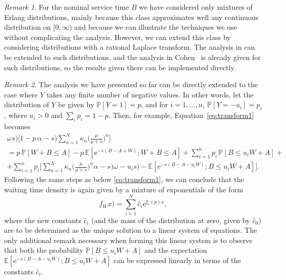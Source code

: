 \documentclass[reqno, 11pt, a4paper]{article}
\theoremstyle{plain}
\theoremstyle{remark}
\newtheorem{remark}{Remark}
\numberwithin{equation}{section}
\begin{document}
\begin{remark}
For the nominal service time $B$ we have considered only mixtures of Erlang distributions, mainly because this class approximates well any continuous distribution on $[0, \infty)$ and because we can illustrate the techniques we use without complicating the analysis. However, we can extend this class by considering distributions with a rational Laplace transform. The analysis in \cite{vlasiou05} can be extended to such distributions, and the analysis in Cohen~\cite[Section II.5.10]{cohen-SSQ} is already given for such distributions, so the results given there can be implemented directly.
\end{remark}

\begin{remark}
The analysis we have presented so far can be directly extended to the case where $Y$ takes any finite number of negative values. In other words, let the distribution of $Y$ be given by ${\mathbb{P}}[Y=1]=p$, and for $i=1,\ldots,n$, ${\mathbb{P}}[Y=-u_i]=p_i$, where $u_i>0$ and $\sum_i p_i=1-p$. Then, for example, Equation~\eqref{eq:transform1} becomes
\begin{multline*}
{\mbox{$\omega^{}$}}s)\Biggl[1-p\,{\mbox{$\alpha^{}$}}-s)\sum_{n=1}^N \kappa_n\biggl(\frac{\mu}{\mu+s}\biggr)^n  \Biggr]\\=
p\,{\mathbb{P}}[W+B\leqslant A]-p\,{\mathbb{E}}[\mathrm{e}^{-s(B-A+W)};W+B\leqslant A]+\sum_{i=1}^n p_i\,{\mathbb{P}}[B\leqslant u_i W+A]+\\
+\sum_{i=1}^n p_i \Biggl[\sum_{n=1}^N \kappa_n \biggl(\frac{\mu}{\mu+s}\biggr)^n {\mbox{$\alpha^{}$}}-s) {\mbox{$\omega^{}$}}-u_i s)- {\mathbb{E}}[\mathrm{e}^{-s(B-A-u_i W)};B\leqslant u_i W+A]\Biggr].
\end{multline*}
Following the same steps as below \eqref{eq:transform1}, we can conclude that the waiting time density is again given by a mixture of exponentials of the form
$$
{\mbox{$f_W^{}$}}x)=\sum_{i=1}^N \hat{c}_i \mathrm{e}^{\xi_i(p)x},
$$
where the new constants $\hat{c}_i$ (and the mass of the distribution at zero, given by $\hat{c}_0$) are to be determined as the unique solution to a linear system of equations. The only additional remark necessary when forming this linear system is to observe that both the probability ${\mathbb{P}}[B\leqslant u_i W+A]$ and the expectation ${\mathbb{E}}[\mathrm{e}^{-s(B-A-u_i W)};B\leqslant u_i W+A]$ can be expressed linearly in terms of the constants $\hat{c}_i$.
\end{remark}
\end{document}
